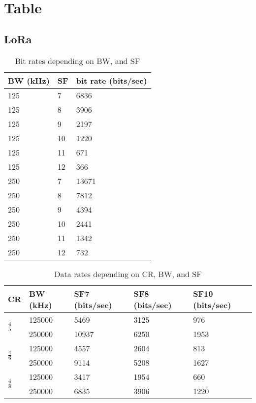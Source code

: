 \chapter{Table}

\section{LoRa}


\begin{table}[h!]
\centering
\begin{tabular}{@{}lll@{}}
\toprule
BW (kHz) & SF & bit rate (bits/sec) \\ \midrule
125     & 7 & 6836 \\
125     & 8 & 3906 \\
125     & 9 & 2197 \\
125     & 10 & 1220 \\
125     & 11 & 671 \\
125     & 12 & 366 \\
250     & 7 & 13671 \\
250     & 8 & 7812 \\
250     & 9 & 4394 \\
250     & 10 & 2441 \\
250     & 11 & 1342 \\
250     & 12 & 732 \\ \bottomrule
\end{tabular}
\caption{Bit rates depending on BW, and SF\label{table:bitrate}}
\end{table}


\begin{table}[h!]
\centering
\begin{tabular}{@{}lllll@{}}
\toprule
CR & BW (kHz) & SF7 (bits/sec) & SF8 (bits/sec) & SF10 (bits/sec) \\ \midrule
\multirow{2}{*}{$\frac{4}{5}$} & 125000   & 5469           & 3125           & 976             \\
  & 250000   & 10937          & 6250           & 1953            \\
\multirow{2}{*}{$\frac{4}{6}$} & 125000   & 4557           & 2604           & 813             \\
  & 250000   & 9114           & 5208           & 1627            \\
\multirow{2}{*}{$\frac{4}{8}$} & 125000   & 3417           & 1954           & 660             \\
  & 250000   & 6835           & 3906           & 1220            \\ \bottomrule
\end{tabular}
\caption{Data rates depending on CR, BW, and SF\label{table:datarate}}
\end{table}

